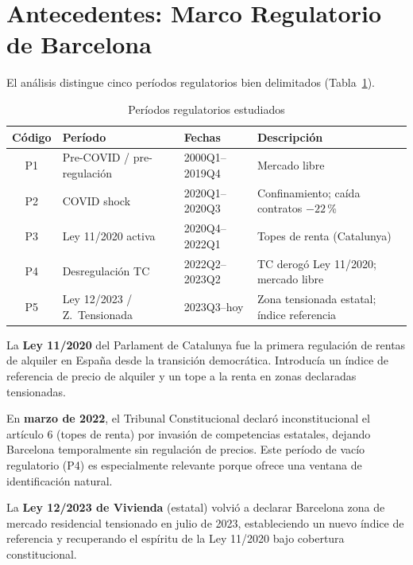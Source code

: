 \documentclass[12pt,a4paper]{article}
\begin{document}
\section{Antecedentes: Marco Regulatorio de Barcelona}
\label{sec:antecedentes}

El análisis distingue cinco períodos regulatorios bien delimitados (Tabla~\ref{tab:periodos}).

\begin{table}[H]
\caption{Períodos regulatorios estudiados}
\label{tab:periodos}
\centering
\small
\begin{threeparttable}
\begin{tabular}{clll}
\toprule
Código & Período & Fechas & Descripción \\
\midrule
P1 & Pre-COVID / pre-regulación & 2000Q1--2019Q4 & Mercado libre \\
P2 & COVID shock                & 2020Q1--2020Q3 & Confinamiento; caída contratos $-22$\,\% \\
P3 & Ley 11/2020 activa         & 2020Q4--2022Q1 & Topes de renta (Catalunya) \\
P4 & Desregulación TC           & 2022Q2--2023Q2 & TC derogó Ley 11/2020; mercado libre \\
P5 & Ley 12/2023 / Z.\ Tensionada& 2023Q3--hoy   & Zona tensionada estatal; índice referencia \\
\bottomrule
\end{tabular}
\end{threeparttable}
\end{table}

La \textbf{Ley 11/2020} del Parlament de Catalunya fue la primera regulación de rentas
de alquiler en España desde la transición democrática. Introducía un índice de
referencia de precio de alquiler y un tope a la renta en zonas declaradas tensionadas.

En \textbf{marzo de 2022}, el Tribunal Constitucional declaró inconstitucional el
artículo 6 (topes de renta) por invasión de competencias estatales, dejando Barcelona
temporalmente sin regulación de precios. Este período de vacío regulatorio (P4) es
especialmente relevante porque ofrece una ventana de identificación natural.

La \textbf{Ley 12/2023 de Vivienda} (estatal) volvió a declarar Barcelona zona de
mercado residencial tensionado en julio de 2023, estableciendo un nuevo índice de
referencia y recuperando el espíritu de la Ley 11/2020 bajo cobertura constitucional.
\end{document}
